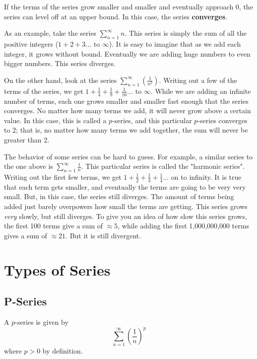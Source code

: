\documentclass[12pt]{report}
\begin{document}
If the terms of the series grow smaller and smaller and eventually approach 0, the series can level off at an upper bound. In this case, the series \textbf{converges}.

As an example, take the series $ \sum_{n=1}^{\infty} n $. This series is simply the sum of all the positive integers ($1 + 2 + 3...$ to $\infty$). It is easy to imagine that as we add each integer, it grows without bound. Eventually we are adding huge numbers to even bigger numbers. This series diverges.

On the other hand, look at the series $ \sum_{n=1}^{\infty} \left( \frac{1}{n^2} \right) $. Writing out a few of the terms of the series, we get $ 1 + \frac{1}{4} + \frac{1}{9} + \frac{1}{16} ...$ to $ \infty $. While we are adding an infinite number of terms, each one grows smaller and smaller fast enough that the series converges. No matter how many terms we add, it will never grow above a certain value. In this case, this is called a $p$-series, and this particular $p$-series converges to 2; that is, no matter how many terms we add together, the sum will never be greater than 2.

The behavior of some series can be hard to guess. For example, a similar series to the one above is $ \sum_{n=1}^{\infty} \frac{1}{n} $. This particular series is called the "harmonic series". Writing out the first few terms, we get $ 1 + \frac{1}{2} + \frac{1}{3} + \frac{1}{4} ... $ on to infinity. It is true that each term gets smaller, and eventually the terms are going to be very very small. But, in this case, the series still diverges. The amount of terms being added just barely overpowers how small the terms are getting. This series grows \textit{very} slowly, but still diverges. To give you an idea of how slow this series grows, the first 100 terms give a sum of $ \approx 5 $, while adding the first 1,000,000,000 terms gives a sum of $ \approx 21 $. But it is still divergent.








\chapter{Types of Series}



\section{P-Series}
A $p$-series is given by
	$$\sum_{n=1}^{\infty} \left( \frac{1}{n} \right)^p$$
where $p > 0$ by definition. \\
\end{document}
